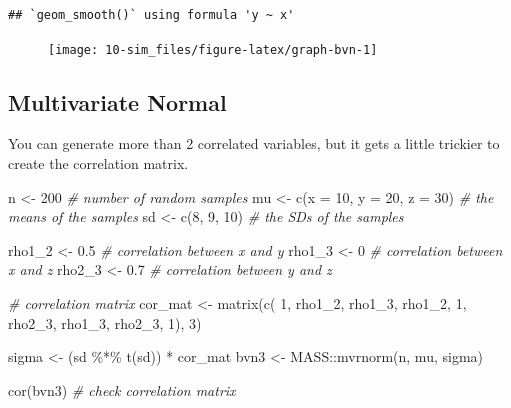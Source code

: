 \documentclass[
  oneside]{book}
\newenvironment{Shaded}{\begin{snugshade}}{\end{snugshade}}
\newcommand{\AttributeTok}[1]{\textcolor[rgb]{0.77,0.63,0.00}{#1}}
\newcommand{\CommentTok}[1]{\textcolor[rgb]{0.56,0.35,0.01}{\textit{#1}}}
\newcommand{\DecValTok}[1]{\textcolor[rgb]{0.00,0.00,0.81}{#1}}
\newcommand{\FloatTok}[1]{\textcolor[rgb]{0.00,0.00,0.81}{#1}}
\newcommand{\FunctionTok}[1]{\textcolor[rgb]{0.00,0.00,0.00}{#1}}
\newcommand{\NormalTok}[1]{#1}
\newcommand{\OtherTok}[1]{\textcolor[rgb]{0.56,0.35,0.01}{#1}}
\newcommand{\SpecialCharTok}[1]{\textcolor[rgb]{0.00,0.00,0.00}{#1}}
\begin{document}
\begin{verbatim}
## `geom_smooth()` using formula 'y ~ x'
\end{verbatim}

\begin{figure}

{\centering \texttt{[image: 10-sim\_files/figure-latex/graph-bvn-1]} 

}

\end{figure}

\hypertarget{mvnorm}{%
\subsection{Multivariate Normal}\label{mvnorm}}

You can generate more than 2 correlated variables, but it gets a little trickier to create the correlation matrix.

\begin{Shaded}
\begin{Highlighting}[]
\NormalTok{n      }\OtherTok{\textless{}{-}} \DecValTok{200} \CommentTok{\# number of random samples}
\NormalTok{mu     }\OtherTok{\textless{}{-}} \FunctionTok{c}\NormalTok{(}\AttributeTok{x =} \DecValTok{10}\NormalTok{, }\AttributeTok{y =} \DecValTok{20}\NormalTok{, }\AttributeTok{z =} \DecValTok{30}\NormalTok{) }\CommentTok{\# the means of the samples}
\NormalTok{sd }\OtherTok{\textless{}{-}} \FunctionTok{c}\NormalTok{(}\DecValTok{8}\NormalTok{, }\DecValTok{9}\NormalTok{, }\DecValTok{10}\NormalTok{)   }\CommentTok{\# the SDs of the samples}

\NormalTok{rho1\_2 }\OtherTok{\textless{}{-}} \FloatTok{0.5} \CommentTok{\# correlation between x and y}
\NormalTok{rho1\_3 }\OtherTok{\textless{}{-}} \DecValTok{0}   \CommentTok{\# correlation between x and z}
\NormalTok{rho2\_3 }\OtherTok{\textless{}{-}} \FloatTok{0.7} \CommentTok{\# correlation between y and z}

\CommentTok{\# correlation matrix}
\NormalTok{cor\_mat }\OtherTok{\textless{}{-}} \FunctionTok{matrix}\NormalTok{(}\FunctionTok{c}\NormalTok{(     }\DecValTok{1}\NormalTok{, rho1\_2, rho1\_3, }
\NormalTok{                    rho1\_2,      }\DecValTok{1}\NormalTok{, rho2\_3,}
\NormalTok{                    rho1\_3, rho2\_3,      }\DecValTok{1}\NormalTok{), }\DecValTok{3}\NormalTok{) }

\NormalTok{sigma }\OtherTok{\textless{}{-}}\NormalTok{ (sd }\SpecialCharTok{\%*\%} \FunctionTok{t}\NormalTok{(sd)) }\SpecialCharTok{*}\NormalTok{ cor\_mat}
\NormalTok{bvn3 }\OtherTok{\textless{}{-}}\NormalTok{ MASS}\SpecialCharTok{::}\FunctionTok{mvrnorm}\NormalTok{(n, mu, sigma)}

\FunctionTok{cor}\NormalTok{(bvn3) }\CommentTok{\# check correlation matrix}
\end{Highlighting}
\end{Shaded}
\end{document}
